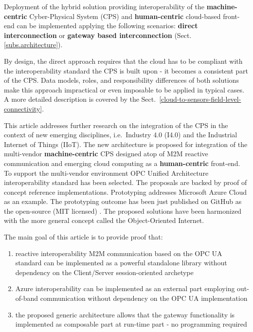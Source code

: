 \documentclass{article}
\begin{document}
Deployment of the hybrid solution providing interoperability of the \textbf{machine-centric} Cyber-Physical System (CPS) and \textbf{human-centric} cloud-based front-end can be implemented applying the following scenarios: \textbf{direct interconnection} or \textbf{gateway based interconnection} (Sect. \ref*{subs.architecture}).

By design, the direct approach requires that the cloud has to be compliant with the interoperability standard the CPS is built upon - it becomes a consistent part of the CPS. Data models, roles, and responsibility differences of both solutions make this approach impractical or even imposable to be applied in typical cases. A more detailed description is covered by the Sect.~\ref*{cloud-to-sensors-field-level-connectivity}.

This article addresses further research on the integration of the CPS in the context of new emerging disciplines, i.e.~Industry 4.0 (I4.0) and the Industrial Internet of Things (IIoT). The new architecture is proposed for integration of the multi-vendor \textbf{machine-centric} CPS designed atop of M2M reactive communication and emerging cloud computing as a \textbf{human-centric} front-end. To support the multi-vendor environment OPC Unified Architecture \cite{LiteratureSurveyOnOpenPlatformCommunications} interoperability standard has been selected. The proposals are backed by proof of concept reference implementations. Prototyping addresses Microsoft Azure Cloud as an example. The prototyping outcome has been just published on GitHub as the open-source (MIT licensed) . The proposed solutions have been harmonized with the more general concept called the Object-Oriented Internet.

The main goal of this article is to provide proof that:

\begin{enumerate}
      \item  reactive interoperability M2M communication based on the OPC UA standard can be implemented as a powerful standalone library without dependency on the Client/Server session-oriented archetype
      \item Azure interoperability can be implemented as an external part employing out-of-band communication without dependency on the OPC UA implementation
      \item the proposed generic architecture allows that the gateway functionality is implemented as composable part at run-time part - no programming required
\end{enumerate}
\end{document}
